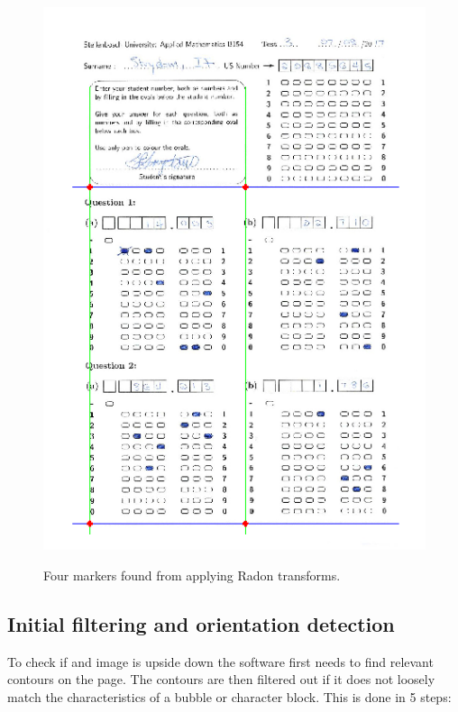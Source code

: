 \begin{figure}
  \centering
  \includegraphics[width=14cm]{RadonResults}\\
  \caption{Four markers found from applying Radon transforms.}
  \label{fig:radonResults}
\end{figure}

\subsection{Initial filtering and orientation detection}
\label{sec:InitImageFilter}

To check if and image is upside down the software first needs to find relevant contours on the page. The contours are then filtered out if it does not loosely match the characteristics of a bubble or character block. This is done in 5 steps:

